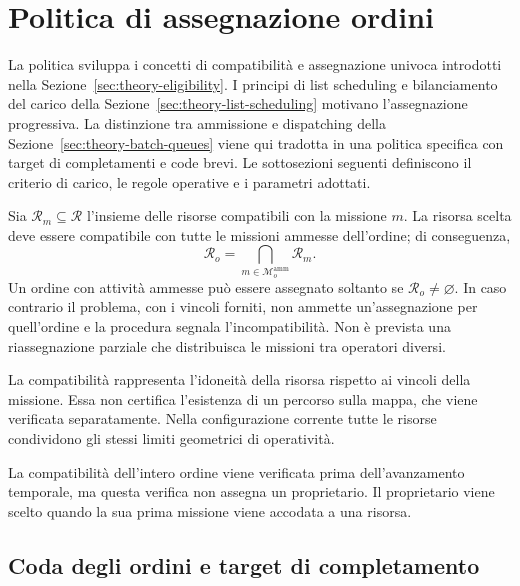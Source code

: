 \section{Politica di assegnazione ordini}
\label{sec:progetto-assegnazione}

La politica sviluppa i concetti di compatibilità e assegnazione univoca
introdotti nella Sezione~\ref{sec:theory-eligibility}. I principi di
list scheduling e bilanciamento del carico della
Sezione~\ref{sec:theory-list-scheduling} motivano l'assegnazione progressiva.
La distinzione tra ammissione e dispatching della
Sezione~\ref{sec:theory-batch-queues} viene qui tradotta in una politica
specifica con target di completamenti e code brevi. Le sottosezioni seguenti
definiscono il criterio di carico, le regole operative e i parametri adottati.

Sia $\mathcal R_m\subseteq\mathcal R$ l'insieme delle risorse compatibili
con la missione $m$. La risorsa scelta deve essere compatibile con tutte le
missioni ammesse dell'ordine; di conseguenza,
\begin{equation}
    \mathcal R_o=
    \bigcap_{m\in\mathcal M_o^{\mathrm{amm}}}\mathcal R_m.
\end{equation}
Un ordine con attività ammesse può essere assegnato soltanto se
$\mathcal R_o\neq\varnothing$. In caso contrario il problema, con i vincoli
forniti, non ammette un'assegnazione per quell'ordine e la procedura segnala
l'incompatibilità. Non è prevista una riassegnazione parziale che distribuisca
le missioni tra operatori diversi.

La compatibilità rappresenta l'idoneità della risorsa rispetto ai vincoli
della missione. Essa non certifica l'esistenza di un percorso sulla mappa,
che viene verificata separatamente. Nella configurazione corrente tutte le
risorse condividono gli stessi limiti geometrici di operatività.

\begin{nota}
La compatibilità dell'intero ordine viene verificata prima dell'avanzamento
temporale, ma questa verifica non assegna un proprietario. Il proprietario
viene scelto quando la sua prima missione viene accodata a una risorsa.
\end{nota}

\newpage

\subsection{Coda degli ordini e target di completamento}

